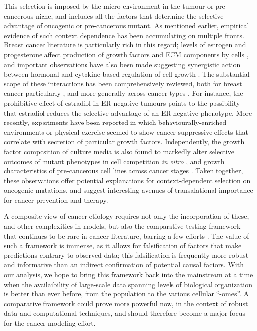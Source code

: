 \documentclass[9pt,twocolumn,twoside]{pnas-new}
\begin{document}
This selection is imposed by the micro-environment in the tumour or pre-cancerous niche, and includes all the factors that determine the selective advantage of oncogenic or pre-cancerous mutant. As mentioned earlier, empirical evidence of such context dependence has been accumulating on multiple fronts. Breast cancer literature is particularly rich in this regard; levels of estrogen and progesterone affect production of growth factors and ECM components by cells \cite{Haslam2001,Woodward2000,DICKSON1987}, and important observations have also been made suggesting synergistic action between hormonal and cytokine-based regulation of cell growth \cite{Freund2003}. The substantial scope of these interactions has been comprehensively reviewed, both for breast cancer particularly \cite{Hansen2000}, and more generally across cancer types \cite{Pietras2010,Hanahan2012,Cabarcas2011a}. For instance, the prohibitive effect of estradiol in ER-negative tumours \cite{Garcia1992} points to the possibility that estradiol reduces the selective advantage of an ER-negative phenotype. More recently, experiments have been reported in which behaviourally-enriched environments or physical exercise seemed to show cancer-suppressive effects \cite{Cao2010,Rundqvist2013} that correlate with secretion of particular growth factors. Independently, the growth factor composition of culture media is also found to markedly alter selective outcomes of mutant phenotypes in cell competition \textit{in vitro} \cite{Archetti2015}, and growth characteristics of pre-cancerous cell lines across cancer stages \cite{Chan2014}. Taken together, these observations offer potential explanations for context-dependent selection on oncogenic mutations, and suggest interesting avenues of transalational importance for cancer prevention and therapy.

A composite view of cancer etiology requires not only the incorporation of these, and other complexities in models, but also the comparative testing framework that continues to be rare in cancer literature, barring a few efforts \cite{Frank2007}. The value of such a framework is immense, as it allows for falsification of factors that make predictions contrary to observed data; this falsification is frequently more robust and informative than an indirect confirmation of potential causal factors. With our analysis, we hope to bring this framework back into the mainstream at a time when the availaibility of large-scale data spanning levels of biological organization is better than ever before, from the population to the various cellular ``-omes''. A comparative framework could prove more powerful now, in the context of robust data and computational techniques, and should therefore become a major focus for the cancer modeling effort.
\end{document}
